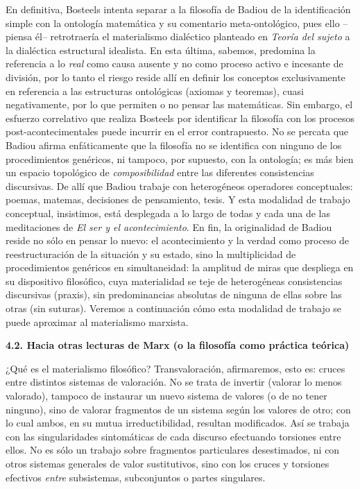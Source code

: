 En definitiva, Bosteels intenta separar a la filosofía de Badiou de la identificación simple con la ontología matemática y su comentario meta-ontológico, pues ello --piensa él-- retrotraería el materialismo dialéctico planteado en \emph{Teoría del sujeto} a la dialéctica estructural idealista. En esta última, sabemos, predomina la referencia a lo \emph{real} como causa ausente y no como proceso activo e incesante de división, por lo tanto el riesgo reside allí en definir los conceptos exclusivamente en referencia a las estructuras ontológicas (axiomas y teoremas), cuasi negativamente, por lo que permiten o no pensar las matemáticas. Sin embargo, el esfuerzo correlativo que realiza Bosteels por identificar la filosofía con los procesos post-acontecimentales puede incurrir en el error contrapuesto. No se percata que Badiou afirma enfáticamente que la filosofía no se identifica con ninguno de los procedimientos genéricos, ni tampoco, por supuesto, con la ontología; es más bien un espacio topológico de \emph{composibilidad} entre las diferentes consistencias discursivas. De allí que Badiou trabaje con heterogéneos operadores conceptuales: poemas, matemas, decisiones de pensamiento, tesis. Y esta modalidad de trabajo conceptual, insistimos, está desplegada a lo largo de todas y cada una de las meditaciones de \emph{El ser y el acontecimiento}. En fin, la originalidad de Badiou reside no sólo en pensar lo nuevo: el acontecimiento y la verdad como proceso de reestructuración de la situación y su estado, sino la multiplicidad de procedimientos genéricos en simultaneidad: la amplitud de miras que despliega en su dispositivo filosófico, cuya materialidad se teje de heterogéneas consistencias discursivas (praxis), sin predominancias absolutas de ninguna de ellas sobre las otras (sin suturas). Veremos a continuación cómo esta modalidad de trabajo se puede aproximar al materialismo marxista.

\textbf{4.2. Hacia otras lecturas de Marx (o la filosofía como práctica teórica)}

¿Qué es el materialismo filosófico? Transvaloración, afirmaremos, esto es: cruces entre distintos sistemas de valoración. No se trata de invertir (valorar lo menos valorado), tampoco de instaurar un nuevo sistema de valores (o de no tener ninguno), sino de valorar fragmentos de un sistema según los valores de otro; con lo cual ambos, en su mutua irreductibilidad, resultan modificados. Así se trabaja con las singularidades sintomáticas de cada discurso efectuando torsiones entre ellos. No es sólo un trabajo sobre fragmentos particulares desestimados, ni con otros sistemas generales de valor sustitutivos, sino con los cruces y torsiones efectivos \emph{entre} subsistemas, subconjuntos o partes singulares.

